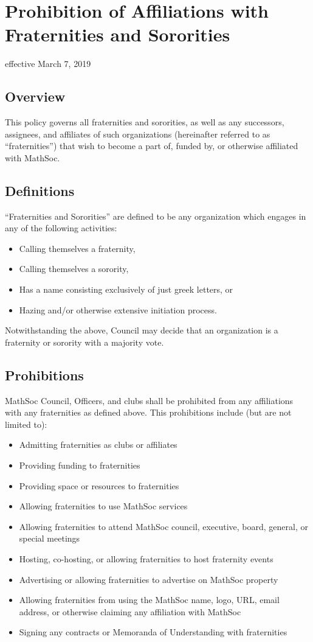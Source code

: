 \section{Prohibition of Affiliations with Fraternities and Sororities}
effective March 7, 2019

\subsection{Overview}
This policy governs all fraternities and sororities, as well as any successors, assignees, and affiliates of such organizations (hereinafter referred to as ``fraternities'') that wish to become a part of, funded by, or otherwise affiliated with MathSoc.

\subsection{Definitions}
``Fraternities and Sororities'' are defined to be any organization which engages in any of the following activities:
\begin{itemize}
    \item Calling themselves a fraternity,
    \item Calling themselves a sorority,
    \item Has a name consisting exclusively of just greek letters, or 
    \item Hazing and/or otherwise extensive initiation process.
\end{itemize}

Notwithstanding the above, Council may decide that an organization is a fraternity or sorority with a majority vote.

\subsection{Prohibitions}

MathSoc Council, Officers, and clubs shall be prohibited from any affiliations with any fraternities as defined above. This prohibitions include (but are not limited to):

\begin{itemize}
\item Admitting fraternities as clubs or affiliates
\item Providing funding to fraternities
\item Providing space or resources to fraternities
\item Allowing fraternities to use MathSoc services
\item Allowing fraternities to attend MathSoc council, executive, board, general, or special meetings
\item Hosting, co-hosting, or allowing fraternities to host fraternity events
\item Advertising or allowing fraternities to advertise on MathSoc property
\item Allowing fraternities from using the MathSoc name, logo, URL, email address, or otherwise claiming any affiliation with MathSoc
\item Signing any contracts or Memoranda of Understanding with fraternities
\end{itemize}

